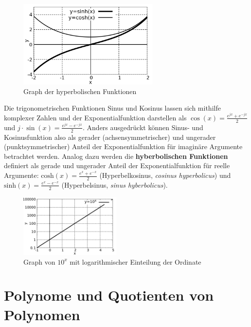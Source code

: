 \begin{minipage}[t]{1\textwidth}
    \begin{figure}
        \centering
        \includegraphics[width=7cm]{./gnuplot/base-function-hyp}
        \caption{Graph der hyperbolischen Funktionen}
        \label{fig:ExBaseFunHyperbolic}
    \end{figure}
    Die trigonometrischen Funktionen Sinus und Kosinus lassen sich mithilfe komplexer Zahlen und der Exponentialfunktion darstellen als $\cos(x) = \frac{e^{jx}+e^{-jx}}{2}$ und $j\cdot \sin(x) = \frac{e^{jx}-e^{-jx}}{2}$. Anders ausgedrückt können Sinus- und Kosinusfunktion also als gerader (achsensymmetrischer) und ungerader (punktsymmetrischer) Anteil der Exponentialfunktion für imaginäre Argumente betrachtet werden. Analog dazu werden die \textbf{hyberbolischen Funktionen} definiert als gerade und ungerader Anteil der Exponentialfunktion für reelle Argumente: $\text{cosh}(x) = \frac{e^x+e^{-x}}{2}$ (Hyperbelkosinus, \emph{cosinus hyperbolicus}) und $\text{sinh}(x) = \frac{e^x-e^{-x}}{2}$ (Hyperbelsinus, \emph{sinus hyberbolicus}).
\end{minipage}


\begin{figure}
    \centering
    \includegraphics[width=0.45\textwidth]{./gnuplot/log-scale-plot}
    \caption{Graph von $10^x$ mit logarithmischer Einteilung der Ordinate}
    \label{fig:LogScalePlot}
\end{figure}

\clearpage

\section{Polynome und Quotienten von Polynomen}

